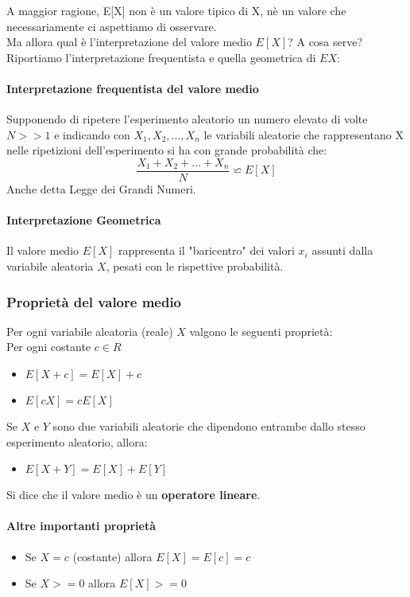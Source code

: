 A maggior ragione, E[X] non è un valore tipico di X, nè un valore che necessariamente
ci aspettiamo di osservare.
\\ Ma allora qual è l'interpretazione del valore medio $E[X]$? A cosa serve?
Riportiamo l'interpretazione frequentista e quella geometrica di $E{X}$:
\paragraph{Interpretazione frequentista del valore medio}
Supponendo di ripetere l'esperimento aleatorio un numero elevato di volte $N >> 1$
e indicando con $X_1, X_2, \dots, X_n$ le variabili aleatorie che rappresentano X nelle
ripetizioni dell'esperimento si ha con grande probabilità che:
\[
	\frac{X_1 + X_2 + \dots + X_n}{N} \backsimeq  E[X]
\]
Anche detta Legge dei Grandi Numeri.

\paragraph{Interpretazione Geometrica}
Il valore medio $E[X]$ rappresenta il "baricentro" dei valori $x_i$ assunti dalla variabile aleatoria $X$, pesati
con le rispettive probabilità.

\subsubsection{Proprietà del valore medio}
Per ogni variabile aleatoria (reale) $X$ valgono le seguenti proprietà:
\\Per ogni costante $c \in R$
\begin{itemize}
	\item $E[X + c] = E[X] + c$
	\item $E[cX] = c E[X]$
\end{itemize}
Se $X$ e $Y$ sono due variabili aleatorie che dipendono entrambe dallo
stesso esperimento aleatorio, allora:
\begin{itemize}
	\item $E[X+Y] = E[X] + E[Y]$
\end{itemize}
Si dice che il valore medio è un\textbf{ operatore lineare}.

\paragraph{Altre importanti proprietà}
\begin{itemize}
	\item Se $X = c$ (costante) allora $E[X] = E[c] = c$
	\item Se $X >= 0$ allora $E[X] >= 0$
\end{itemize}


